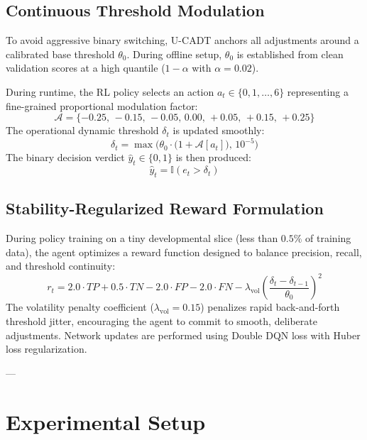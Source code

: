 \documentclass[conference]{IEEEtran}
\begin{document}
\subsection{Continuous Threshold Modulation}
To avoid aggressive binary switching, U-CADT anchors all adjustments around a calibrated base threshold $\theta_0$. During offline setup, $\theta_0$ is established from clean validation scores at a high quantile ($1 - \alpha$ with $\alpha = 0.02$).

During runtime, the RL policy selects an action $a_t \in \{0, 1, \dots, 6\}$ representing a fine-grained proportional modulation factor:
\begin{equation}
\mathcal{A} = \{-0.25, \, -0.15, \, -0.05, \, 0.00, \, +0.05, \, +0.15, \, +0.25\}
\end{equation}
The operational dynamic threshold $\delta_t$ is updated smoothly:
\begin{equation}
\delta_t = \max\Big( \theta_0 \cdot \big(1 + \mathcal{A}[a_t]\big), \, 10^{-5} \Big)
\end{equation}
The binary decision verdict $\hat{y}_t \in \{0, 1\}$ is then produced:
\begin{equation}
\hat{y}_t = \mathbb{I}(e_t > \delta_t)
\end{equation}

\subsection{Stability-Regularized Reward Formulation}
During policy training on a tiny developmental slice (less than $0.5\%$ of training data), the agent optimizes a reward function designed to balance precision, recall, and threshold continuity:
\begin{equation}
r_t = 2.0 \cdot TP + 0.5 \cdot TN - 2.0 \cdot FP - 2.0 \cdot FN - \lambda_{\text{vol}} \left( \frac{\delta_t - \delta_{t-1}}{\theta_0} \right)^2
\end{equation}
The volatility penalty coefficient ($\lambda_{\text{vol}} = 0.15$) penalizes rapid back-and-forth threshold jitter, encouraging the agent to commit to smooth, deliberate adjustments. Network updates are performed using Double DQN loss with Huber loss regularization.

---

\section{Experimental Setup}
\end{document}
